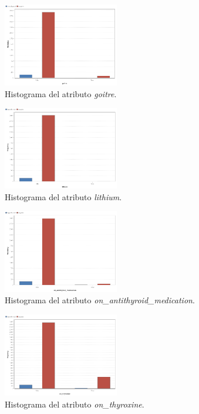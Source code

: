 \documentclass[osajnl,twocolumn,showpacs,superscriptaddress,10pt,floatfix]{revtex4-1} %
\begin{document}
\begin{figure}[H]
    \centering
    \includegraphics[width=0.45\textwidth]{analysis/histogram_goitre}
    \caption{Histograma del atributo \textit{goitre}.}
    \label{figure:histogram_goitre}
\end{figure}

\begin{figure}[H]
    \centering
    \includegraphics[width=0.45\textwidth]{analysis/histogram_lithium}
    \caption{Histograma del atributo \textit{lithium}.}
    \label{figure:histogram_lithium}
\end{figure}

\begin{figure}[H]
    \centering
    \includegraphics[width=0.45\textwidth]{analysis/histogram_on_antithyroid_medication}
    \caption{Histograma del atributo \textit{on\_antithyroid\_medication}.}
    \label{figure:on_antithyroid_medication}
\end{figure}

\begin{figure}[H]
    \centering
    \includegraphics[width=0.45\textwidth]{analysis/histogram_on_thyroxine}
    \caption{Histograma del atributo \textit{on\_thyroxine}.}
    \label{figure:on_thyroxine}
\end{figure}
\end{document}
